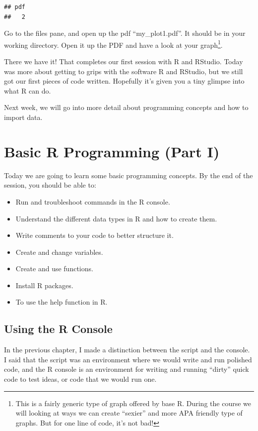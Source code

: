 \documentclass[
]{book}
\begin{document}
\begin{verbatim}
## pdf 
##   2
\end{verbatim}

Go to the files pane, and open up the pdf ``my\_plot1.pdf''. It should be in your working directory. Open it up the PDF and have a look at your graph\footnote{This is a fairly generic type of graph offered by base R. During the course we will looking at ways we can create ``sexier'' and more APA friendly type of graphs. But for one line of code, it's not bad!}.

There we have it! That completes our first session with R and RStudio. Today was more about getting to grips with the software R and RStudio, but we still got our first pieces of code written. Hopefully it's given you a tiny glimpse into what R can do.

Next week, we will go into more detail about programming concepts and how to import data.

\hypertarget{programming1}{%
\chapter{Basic R Programming (Part I)}\label{programming1}}

Today we are going to learn some basic programming concepts. By the end of the session, you should be able to:

\begin{itemize}
\item
  Run and troubleshoot commands in the R console.
\item
  Understand the different data types in R and how to create them.
\item
  Write comments to your code to better structure it.
\item
  Create and change variables.
\item
  Create and use functions.
\item
  Install R packages.
\item
  To use the help function in R.
\end{itemize}

\hypertarget{using-the-r-console}{%
\section{Using the R Console}\label{using-the-r-console}}

In the previous chapter, I made a distinction between the script and the console. I said that the script was an environment where we would write and run polished code, and the R console is an environment for writing and running ``dirty'' quick code to test ideas, or code that we would run one.
\end{document}

